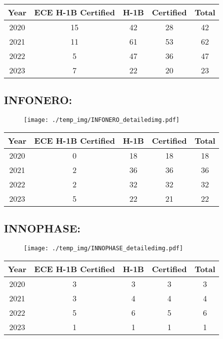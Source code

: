\documentclass{article}%
\begin{document}
%
\begin{longtable}{c|c|c|c|c}%
\hline%
Year&ECE H{-}1B Certified&H{-}1B&Certified&Total\\%
\hline%
2020&15&42&28&42\\%
\hline%
2021&11&61&53&62\\%
\hline%
2022&5&47&36&47\\%
\hline%
2023&7&22&20&23\\%
\hline%
\end{longtable}

%
\newpage%
\subsection{INFONERO:}%
\label{subsec:INFONERO}%
\label{INFONEROdetailed}%


\begin{figure}[htbp]%
\centering%
\texttt{[image: ./temp\_img/INFONERO\_detailedimg.pdf]}%
\end{figure}

%
\begin{longtable}{c|c|c|c|c}%
\hline%
Year&ECE H{-}1B Certified&H{-}1B&Certified&Total\\%
\hline%
2020&0&18&18&18\\%
\hline%
2021&2&36&36&36\\%
\hline%
2022&2&32&32&32\\%
\hline%
2023&5&22&21&22\\%
\hline%
\end{longtable}

%
\newpage%
\subsection{INNOPHASE:}%
\label{subsec:INNOPHASE}%
\label{INNOPHASEdetailed}%


\begin{figure}[htbp]%
\centering%
\texttt{[image: ./temp\_img/INNOPHASE\_detailedimg.pdf]}%
\end{figure}

%
\begin{longtable}{c|c|c|c|c}%
\hline%
Year&ECE H{-}1B Certified&H{-}1B&Certified&Total\\%
\hline%
2020&3&3&3&3\\%
\hline%
2021&3&4&4&4\\%
\hline%
2022&5&6&5&6\\%
\hline%
2023&1&1&1&1\\%
\hline%
\end{longtable}
\end{document}
